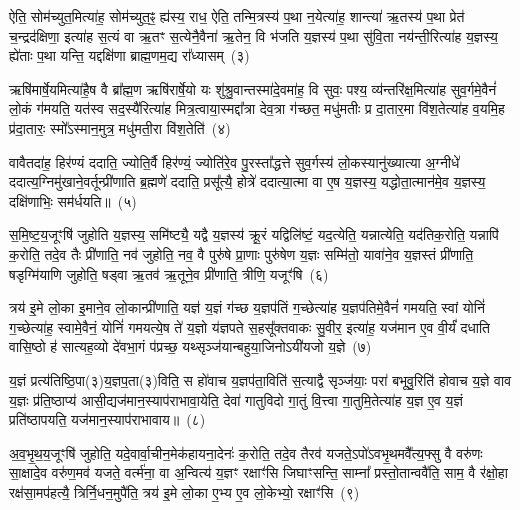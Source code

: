 ऐति॒ सोम॑च्युत॒मित्या॑ह॒ सोम॑च्युत॒ꣴ॒ ह्य॑स्य॒ राध॒ ऐति॒ तन्मि॒त्रस्य॑ प॒था न॒येत्या॑ह॒ शान्त्या॑ ऋ॒तस्य॑ प॒था प्रेत॑ च॒न्द्रद॑क्षिणा॒ इत्या॑ह स॒त्यं वा ऋ॒तꣳ स॒त्येनै॒वैना॑ ऋ॒तेन॒ वि भ॑जति य॒ज्ञस्य॑ प॒था सु॑वि॒ता नय॑न्ती॒रित्या॑ह य॒ज्ञस्य॒ ह्ये॑ताः प॒था यन्ति॒ यद्दक्षि॑णा ब्राह्म॒णम॒द्य रा᳚ध्यासम्~(३)\ip

ऋषि॑मार्\mbox{}षे॒यमित्या॑है॒ष वै ब्रा᳚ह्म॒ण ऋषि॑रार्\mbox{}षे॒यो यः शु॑श्रु॒वान्तस्मा॑दे॒वमा॑ह॒ वि सुवः॒ पश्य॒ व्य॑न्तरि॑क्ष॒मित्या॑ह सुव॒र्गमे॒वैनं॑ लो॒कं ग॑मयति॒ यत॑स्व सद॒स्यै॑रित्या॑ह मित्र॒त्वाया॒स्मद्दा᳚त्रा देव॒त्रा ग॑च्छत॒ मधु॑मतीः प्र दा॒तार॒मा वि॑श॒तेत्या॑ह व॒यमि॒ह प्र॑दा॒तारः॒ स्मो᳚\-ऽस्मान॒मुत्र॒ मधु॑मती॒रा वि॑श॒तेति॑~(४)\ip

वावैतदा॑ह॒ हिर॑ण्यं ददाति॒ ज्योति॒र्वै हिर॑ण्यं॒ ज्योति॑रे॒व पु॒रस्ता᳚द्धत्ते सुव॒र्गस्य॑ लो॒कस्यानु॑ख्यात्या अ॒ग्नीधे॑ ददात्य॒ग्निमु॑खाने॒वर्तून्प्री॑णाति ब्र॒ह्मणे॑ ददाति॒ प्रसू᳚त्यै॒ होत्रे॑ ददात्या॒त्मा वा ए॒ष य॒ज्ञस्य॒ यद्धोता॒त्मान॑मे॒व य॒ज्ञस्य॒ दक्षि॑णाभिः॒ सम॑र्धयति॥~(५)\ip

{\anuvakamend[{हिर॑ण्य॒ꣳ॒ राधो॑ राध्यासम॒मुत्र॒ मधु॑मती॒रा वि॑श॒तेत्य॒ष्टात्रिꣳ॑शच्च}]}

स॒मि॒ष्ट॒य॒जूꣳषि॑ जुहोति य॒ज्ञस्य॒ समि॑ष्ट्यै॒ यद्वै य॒ज्ञस्य॑ क्रू॒रं यद्विलि॑ष्टं॒ यद॒त्येति॒ यन्नात्येति॒ यद॑तिक॒रोति॒ यन्नापि॑ क॒रोति॒ तदे॒व तैः प्री॑णाति॒ नव॑ जुहोति॒ नव॒ वै पुरु॑षे प्रा॒णाः पुरु॑षेण य॒ज्ञः सम्मि॑तो॒ यावा॑ने॒व य॒ज्ञस्तं प्री॑णाति॒ षडृग्मि॑याणि जुहोति॒ षड्वा ऋ॒तव॑ ऋ॒तूने॒व प्री॑णाति॒ त्रीणि॒ यजूꣳ॑षि~(६)\ip

त्रय॑ इ॒मे लो॒का इ॒माने॒व लो॒कान्प्री॑णाति॒ यज्ञ॑ य॒ज्ञं ग॑च्छ य॒ज्ञप॑तिं ग॒च्छेत्या॑ह य॒ज्ञप॑तिमे॒वैनं॑ गमयति॒ स्वां योनिं॑ ग॒च्छेत्या॑ह॒ स्वामे॒वैनं॒ योनिं॑ गमयत्ये॒ष ते॑ य॒ज्ञो य॑ज्ञपते स॒हसू᳚क्तवाकः सु॒वीर॒ इत्या॑ह॒ यज॑मान ए॒व वी॒र्यं॑ दधाति वासि॒ष्ठो ह॑ सात्यह॒व्यो दे॑वभा॒गं प॑प्रच्छ॒ यथ्सृञ्ज॑यान्बहुया॒जिनो\-ऽयी॑यजो य॒ज्ञे~(७)\ip

य॒ज्ञं प्रत्य॑तिष्ठि॒पा(३)य॒ज्ञप॒ता(३)विति॒ स हो॑वाच य॒ज्ञप॑ता॒विति॑ स॒त्याद्वै सृञ्ज॑याः॒ परा॑ बभूवु॒रिति॑ होवाच य॒ज्ञे वाव य॒ज्ञः प्र॑ति॒ष्ठाप्य॑ आसी॒द्यज॑मान॒स्याप॑राभावा॒येति॒ देवा॑ गातुविदो गा॒तुं वि॒त्त्वा गा॒तुमि॒तेत्या॑ह य॒ज्ञ ए॒व य॒ज्ञं प्रति॑\-ष्ठापयति॒ यज॑मान॒स्याप॑राभावाय॥~(८)\ip

{\anuvakamend[{यजूꣳ॑षि य॒ज्ञ एक॑चत्वारिꣳशच्च}]}

अ॒व॒भृ॒थ॒य॒जूꣳषि॑ जुहोति॒ यदे॒वार्वा॒चीन॒मेक॑हायना॒देनः॑ क॒रोति॒ तदे॒व तैरव॑ यजते॒\-ऽपो॑\-ऽवभृ॒थमवै᳚त्य॒फ्सु वै वरु॑णः सा॒क्षादे॒व वरु॑ण॒मव॑ यजते॒ वर्त्म॑ना॒ वा अ॒न्वित्य॑ य॒ज्ञꣳ रक्षाꣳ॑सि जिघाꣳसन्ति॒ साम्ना᳚ प्रस्तो॒तान्ववै॑ति॒ साम॒ वै र॑क्षो॒हा रक्ष॑सा॒मप॑हत्यै॒ त्रिर्नि॒धन॒मुपै॑ति॒ त्रय॑ इ॒मे लो॒का ए॒भ्य ए॒व लो॒केभ्यो॒ रक्षाꣳ॑सि~(९)\ip

